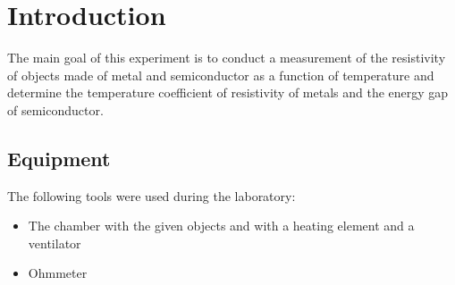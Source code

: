 \section{Introduction}


The main goal of this experiment is to conduct a measurement of the resistivity of objects made of metal and semiconductor as a function of temperature and determine the temperature coefficient of resistivity of metals and the energy gap of semiconductor.
\subsection{Equipment}

The following tools were used during the laboratory:

\begin{itemize}
\item The chamber with the given objects and with a heating element and a ventilator 
\item Ohmmeter

\end{itemize}

